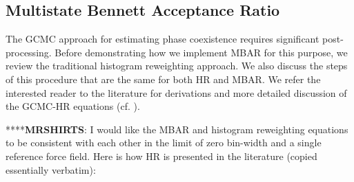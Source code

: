\documentclass[journal=jced,manuscript=article]{achemso}
\begin{document}
\subsection{Multistate Bennett Acceptance Ratio} \label{sec: MBAR}

The GCMC approach for estimating phase coexistence requires significant post-processing. Before demonstrating how we implement MBAR for this purpose, we review the traditional histogram reweighting approach. We also discuss the steps of this procedure that are the same for both HR and MBAR. We refer the interested reader to the literature for derivations and more detailed discussion of the GCMC-HR equations (cf. ).



****\textbf{MRSHIRTS}: I would like the MBAR and histogram reweighting equations to be consistent with each other in the limit of zero bin-width and a single reference force field. Here is how HR is presented in the literature (copied essentially verbatim):
\end{document}
